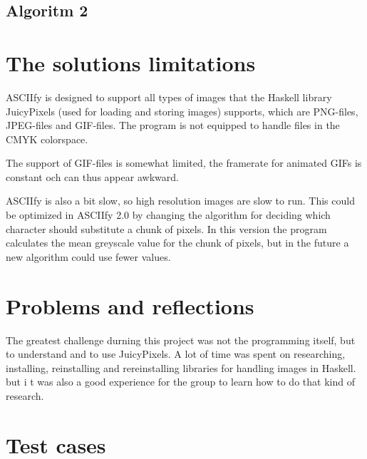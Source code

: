 \documentclass[12pt, a4paper]{article}
\begin{document}
		\subsection{Algoritm 2}

	\section{The solutions limitations}

	ASCIIfy is designed to support all types of images that the Haskell library JuicyPixels (used for loading and storing images) supports, which are PNG-files, JPEG-files and GIF-files. The program is not equipped to handle files in the CMYK colorspace.

	The support of GIF-files is somewhat limited, the framerate for animated GIFs is constant och can thus appear awkward.

	ASCIIfy is also a bit slow, so high resolution images are slow to run. This could be optimized in ASCIIfy 2.0 by changing the algorithm for deciding which character should substitute a chunk of pixels. In this version the program calculates the mean greyscale value for the chunk of pixels, but in the future a new algorithm could use fewer values. 



	\section{Problems and reflections}

		The greatest challenge durning this project was not the programming itself, but to understand and to use JuicyPixels. A lot of time was spent on researching, installing, reinstalling and rereinstalling libraries for handling images in Haskell. but i t was also a good experience for the group to learn how to do that kind of research. 



	\section{Test cases}
\end{document}
